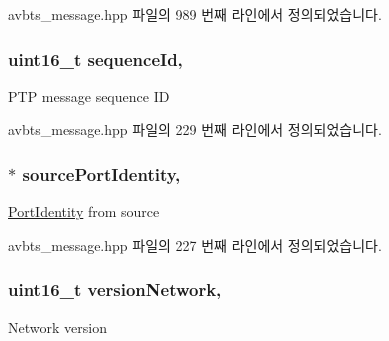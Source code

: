 avbts\+\_\+message.\+hpp 파일의 989 번째 라인에서 정의되었습니다.

\subsubsection[{\texorpdfstring{sequence\+Id}{sequenceId}}]{\setlength{\rightskip}{0pt plus 5cm}uint16\+\_\+t sequence\+Id\hspace{0.3cm}{\ttfamily [protected]}, {\ttfamily [inherited]}}\hypertarget{class_p_t_p_message_common_a189710d5cff10c03f77d72a276a5f58e}{}\label{class_p_t_p_message_common_a189710d5cff10c03f77d72a276a5f58e}
P\+TP message sequence ID 

avbts\+\_\+message.\+hpp 파일의 229 번째 라인에서 정의되었습니다.

\subsubsection[{\texorpdfstring{source\+Port\+Identity}{sourcePortIdentity}}]{$\ast$ source\+Port\+Identity\hspace{0.3cm}{\ttfamily [protected]}, {\ttfamily [inherited]}}\hypertarget{class_p_t_p_message_common_a415b5544bdd3ea41dae460fa1af900d9}{}\label{class_p_t_p_message_common_a415b5544bdd3ea41dae460fa1af900d9}
\hyperlink{class_port_identity}{Port\+Identity} from source 

avbts\+\_\+message.\+hpp 파일의 227 번째 라인에서 정의되었습니다.

\subsubsection[{\texorpdfstring{version\+Network}{versionNetwork}}]{\setlength{\rightskip}{0pt plus 5cm}uint16\+\_\+t version\+Network\hspace{0.3cm}{\ttfamily [protected]}, {\ttfamily [inherited]}}\hypertarget{class_p_t_p_message_common_a79d99d7b79ee6ad4bbd03b301ccccb53}{}\label{class_p_t_p_message_common_a79d99d7b79ee6ad4bbd03b301ccccb53}
Network version 

